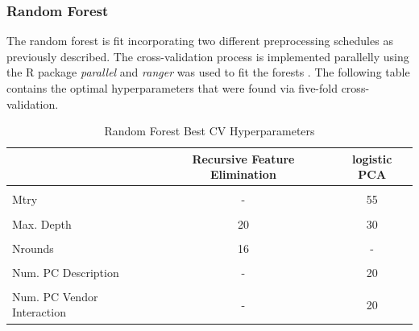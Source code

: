 \documentclass[a4paper,12pt, headsepline]{scrartcl}
\numberwithin{equation}{section}
\begin{document}
\subsubsection{Random Forest}
The random forest is fit incorporating two different preprocessing schedules as previously described. The cross-validation process is implemented parallelly using the R package \textit{parallel} and \textit{ranger} was used to fit the forests \citep{ranger, R}. The following table contains the optimal hyperparameters that were found via five-fold cross-validation.

\begin{table}[H]
	\centering
	\begin{tabular}[t]{lcc}
		\toprule
		& Recursive Feature Elimination & logistic PCA \\
		\midrule
		\cellcolor{gray!6}{Node Feature Share} & \cellcolor{gray!6}{85\%} & \cellcolor{gray!6}{-}\\
		Mtry & - & 55\\
		\cellcolor{gray!6}{Min. Node Size} & \cellcolor{gray!6}{3} & \cellcolor{gray!6}{1}\\
		Max. Depth & 20 & 30\\
		\cellcolor{gray!6}{Num. Trees} & \cellcolor{gray!6}{1500} & \cellcolor{gray!6}{1000}\\
		Nrounds & 16 & -\\
		\cellcolor{gray!6}{Covariate Share} & \cellcolor{gray!6}{75\%} & \cellcolor{gray!6}{-}\\
		Num. PC Description & - & 20\\
		\cellcolor{gray!6}{Num. PC Vendors} & \cellcolor{gray!6}{-} & \cellcolor{gray!6}{10}\\
		Num. PC Vendor Interaction & - & 20\\
		\bottomrule
	\end{tabular}
	\caption{Random Forest Best CV Hyperparameters}\label{tab:RF}
\end{table}
\end{document}
